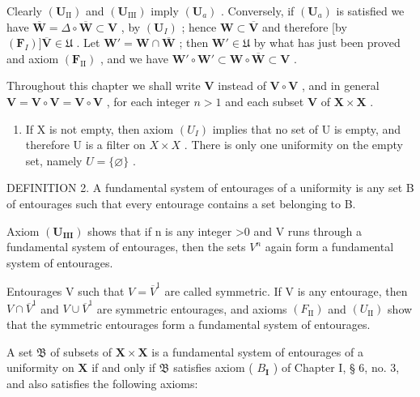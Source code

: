 Clearly \((\mathbf{U}_{\mathrm{II}})\) and \((\mathbf{U}_{\mathrm{III}})\) imply \((\mathbf{U}_a)\) . Conversely, if \((\mathbf{U}_a)\) is satisfied we have \(\overline{\mathbf{W}} = \Delta \circ \overline{\mathbf{W}} \subset \mathbf{V}\) , by \((\mathbf{U}_I)\) ; hence \(\mathbf{W} \subset \overline{\mathbf{V}}\) and therefore {[}by \((\mathbf{F}_I)] \overline{\mathbf{V}} \in \mathfrak{U}\) . Let \(\mathbf{W}' = \mathbf{W} \cap \overline{\mathbf{W}}\) ; then \(\mathbf{W}' \in \mathfrak{U}\) by what has just been proved and axiom \((\mathbf{F}_{\mathrm{II}})\) , and we have \(\mathbf{W}' \circ \mathbf{W}' \subset \mathbf{W} \circ \overline{\mathbf{W}} \subset \mathbf{V}\) .

Throughout this chapter we shall write \(\mathbf{V}\) instead of \(\mathbf{V} \circ \mathbf{V}\) , and in general \(\mathbf{V} = \mathbf{V} \circ \mathbf{V} = \mathbf{V} \circ \mathbf{V}\) , for each integer \(n > 1\) and each subset \(\mathbf{V}\) of \(\mathbf{X} \times \mathbf{X}\) .

\begin{enumerate}
\def\labelenumi{\arabic{enumi})}
\setcounter{enumi}{2}
\tightlist
\item
  If X is not empty, then axiom \((U_{I})\) implies that no set of U is empty, and therefore U is a filter on \(X \times X\) . There is only one uniformity on the empty set, namely \(U = \{\varnothing\}\) .
\end{enumerate}

DEFINITION 2. A fundamental system of entourages of a uniformity is any set B of entourages such that every entourage contains a set belonging to B.

Axiom \((\mathbf{U}_{\mathbf{III}})\) shows that if n is any integer \textgreater0 and V runs through a fundamental system of entourages, then the sets \(V^{n}\) again form a fundamental system of entourages.

Entourages V such that \(V = \overline{V}^{1}\) are called symmetric. If V is any entourage, then \(V \cap \overline{V}^{1}\) and \(V \cup \overline{V}^{1}\) are symmetric entourages, and axioms \((F_{\mathrm{II}})\) and \((U_{\mathrm{II}})\) show that the symmetric entourages form a fundamental system of entourages.

A set \(\mathfrak{B}\) of subsets of \(\mathbf{X} \times \mathbf{X}\) is a fundamental system of entourages of a uniformity on \(\mathbf{X}\) if and only if \(\mathfrak{B}\) satisfies axiom ( \(B_{\mathbf{I}}\) ) of Chapter I, § 6, no. 3, and also satisfies the following axioms:

